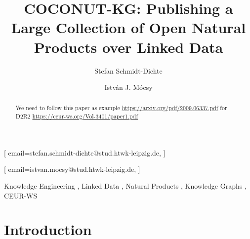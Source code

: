 \documentclass[
]{ceurart}
\begin{document}


\title{COCONUT-KG: Publishing a Large Collection of Open Natural Products over Linked Data}


\author[1]{Stefan Schmidt-Dichte}[%
email=stefan.schmidt-dichte@stud.htwk-leipzig.de,
]
\cormark[1]
\address[1]{AKSW, Leipzig University of Applied Sciences (HTWK),
  Gustav-Freytag-Straße 42a, Leipzig, 04277, Germany}

\author[1]{István J. Mócsy}[%
email=istvan.mocsy@stud.htwk-leipzig.de,
]





\begin{abstract}
We need to follow this paper as example \url{https://arxiv.org/pdf/2009.06337.pdf} for D2R2 \url{https://ceur-ws.org/Vol-3401/paper1.pdf}
\end{abstract}

\begin{keywords}
  Knowledge Engineering \sep
  Linked Data \sep
  Natural Products \sep
  Knowledge Graphs \sep
  CEUR-WS
\end{keywords}

\maketitle

\section{Introduction}
\end{document}
